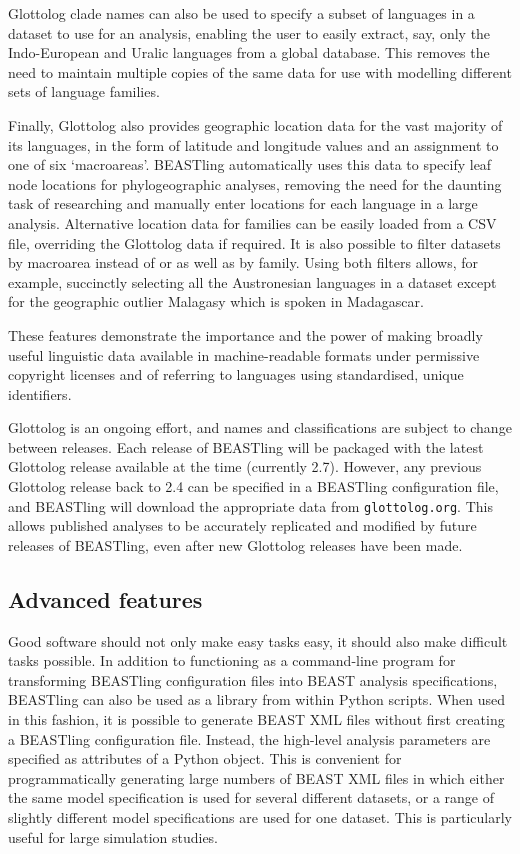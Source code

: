 \documentclass[twocolumn,10pt]{scrartcl}
\begin{document}
Glottolog clade names can also be used to specify a subset of languages in a dataset to use for an analysis, enabling the user to easily extract, say, only the Indo-European and Uralic languages from a global database.  This removes the need to maintain multiple copies of the same data for use with modelling different sets of language families.

Finally, Glottolog also provides geographic location data for the vast majority of its languages, in the form of latitude and longitude values and an assignment to one of six `macroareas'\cite{Hammarstroem2014}.  BEASTling automatically uses this data to specify leaf node locations for phylogeographic analyses, removing the need for the daunting task of researching and manually enter locations for each language in a large analysis.  Alternative location data for families can be easily loaded from a CSV file, overriding the Glottolog data if required.  It is also possible to filter datasets by macroarea instead of or as well as by family.  Using both filters allows, for example, succinctly selecting all the Austronesian languages in a dataset except for the geographic outlier Malagasy which is spoken in Madagascar.

These features demonstrate the importance and the power of making broadly useful linguistic data available in machine-readable formats under permissive copyright licenses and of referring to languages using standardised, unique identifiers.

Glottolog is an ongoing effort, and names and classifications are subject to change between releases.  Each release of BEASTling will be packaged with the latest Glottolog release available at the time (currently 2.7).  However, any previous Glottolog release back to 2.4 can be specified in a BEASTling configuration file, and BEASTling will download the appropriate data from \texttt{glottolog.org}.  This allows published analyses to be accurately replicated and modified by future releases of BEASTling, even after new Glottolog releases have been made.

\subsection{Advanced features}

Good software should not only make easy tasks easy, it should also make difficult tasks possible.  In addition to functioning as a command-line program for transforming BEASTling configuration files into BEAST analysis specifications, BEASTling can also be used as a library from within Python scripts.  When used in this fashion, it is possible to generate BEAST XML files without first creating a BEASTling configuration file.  Instead, the high-level analysis parameters are specified as attributes of a Python object.  This is convenient for programmatically generating large numbers of BEAST XML files in which either the same model specification is used for several different datasets, or a range of slightly different model specifications are used for one dataset.  This is particularly useful for large simulation studies.
\end{document}
